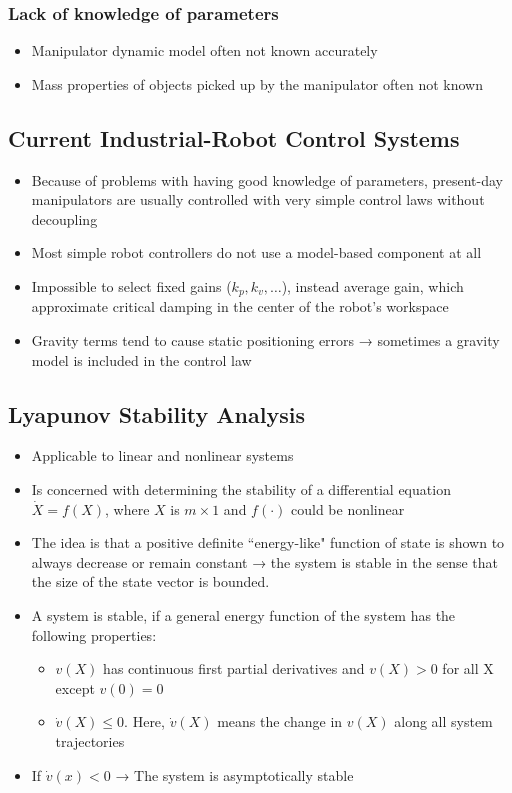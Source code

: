 \documentclass[10pt,a4paper]{article}
\begin{document}
\subsubsection{Lack of knowledge of parameters}
\begin{itemize}
	\item Manipulator dynamic model often not known accurately
	\item Mass properties of objects picked up by the manipulator often not known
\end{itemize}

\subsection{Current Industrial-Robot Control Systems}
\begin{itemize}
	\item Because of problems with having good knowledge of parameters, present-day manipulators are usually controlled with very simple control laws without decoupling
	\item Most simple robot controllers do not use a model-based component at all
	\item Impossible to select fixed gains ($k_p, k_v, \dots$), instead average gain, which approximate critical damping in the center of the robot's workspace
	\item Gravity terms tend to cause static positioning errors → sometimes a gravity model is included in the control law
\end{itemize}

\subsection{Lyapunov Stability Analysis}
\begin{itemize}
	\item Applicable to linear and nonlinear systems
	\item Is concerned with determining the stability of a differential equation $\dot X = f(X)$, where $X$ is $m \times 1$ and $f(⋅)$ could be nonlinear
	\item The idea is that a positive definite ``energy-like" function of state is shown to always decrease or remain constant → the system is stable in the sense that the size of the state vector is bounded.
	\item A system is stable, if a general energy function of the system has the following properties:
	\begin{itemize}
		\item $v(X)$ has continuous first partial derivatives and $v(X) > 0$ for all X except $v(0) = 0$
		\item $\dot v(X) ≤ 0$. Here, $\dot v(X)$ means the change in $v(X)$ along all system trajectories
	\end{itemize}	
	\item If $\dot v(x) < 0$ → The system is asymptotically stable
\end{itemize}
\end{document}
